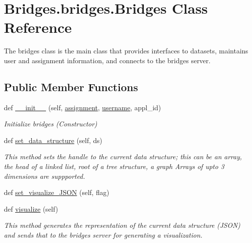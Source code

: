 \hypertarget{class_bridges_1_1bridges_1_1_bridges}{}\section{Bridges.\+bridges.\+Bridges Class Reference}
\label{class_bridges_1_1bridges_1_1_bridges}


The bridges class is the main class that provides interfaces to datasets, maintains user and assignment information, and connects to the bridges server.  


\subsection*{Public Member Functions}
\begin{DoxyCompactItemize}
\item 
def \mbox{\hyperlink{class_bridges_1_1bridges_1_1_bridges_ad3a26dd5ee8dea00adbc5345e4f313d6}{\+\_\+\+\_\+init\+\_\+\+\_\+}} (self, \mbox{\hyperlink{class_bridges_1_1bridges_1_1_bridges_a66e278ddefd9a2c94c01eb0fc9bbc568}{assignment}}, \mbox{\hyperlink{class_bridges_1_1bridges_1_1_bridges_a09593511340ae03bed2abbf9dd12f48f}{username}}, appl\+\_\+id)
\begin{DoxyCompactList}\small\item\em Initialize bridges (Constructor) \end{DoxyCompactList}\item 
def \mbox{\hyperlink{class_bridges_1_1bridges_1_1_bridges_adab1ccb3816211bc81054f8fb537833f}{set\+\_\+data\+\_\+structure}} (self, ds)
\begin{DoxyCompactList}\small\item\em This method sets the handle to the current data structure; this can be an array, the head of a linked list, root of a tree structure, a graph Arrays of upto 3 dimensions are suppported. \end{DoxyCompactList}\item 
def \mbox{\hyperlink{class_bridges_1_1bridges_1_1_bridges_a945f547bc7feb7e129811f8874a3af6b}{set\+\_\+visualize\+\_\+\+J\+S\+ON}} (self, flag)
\item 
def \mbox{\hyperlink{class_bridges_1_1bridges_1_1_bridges_ad25ec4119ef21f031c6240a9d6d996c6}{visualize}} (self)
\begin{DoxyCompactList}\small\item\em This method generates the representation of the current data structure (J\+S\+ON) and sends that to the bridges server for generating a visualization. \end{DoxyCompactList}\item 

\end{DoxyCompactItemize}
